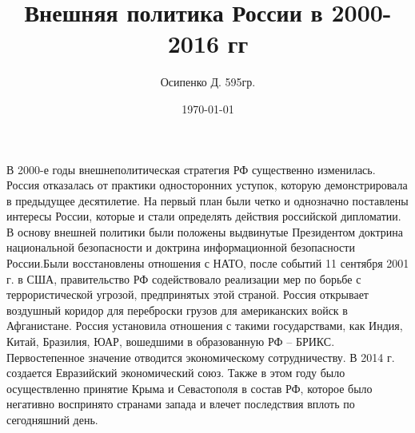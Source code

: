 \documentclass[a4paper, 12pt]{article}
\title{Внешняя политика России в 2000-2016 гг}
\author{Осипенко Д. 595гр.}
\date{\today}
\begin{document}
\sffamily
\maketitle
В 2000-е годы внешнеполитическая стратегия РФ существенно изменилась. Россия отказалась от практики односторонних уступок, которую демонстрировала в предыдущее десятилетие. На первый план были четко и однозначно поставлены интересы России, которые и стали определять действия российской дипломатии. В основу внешней политики были положены выдвинутые Президентом доктрина национальной безопасности и доктрина информационной безопасности России.Были восстановлены отношения с НАТО, после событий 11 сентября 2001 г. в США, правительство РФ содействовало реализации мер по борьбе с террористической угрозой, предпринятых этой страной. Россия открывает воздушный коридор для переброски грузов для американских войск в Афганистане. Россия установила отношения с такими государствами, как Индия, Китай, Бразилия, ЮАР, вошедшими в образованную РФ – БРИКС. Первостепенное значение отводится экономическому сотрудничеству. В 2014 г. создается Евразийский экономический союз. Также в этом году было осуществленно принятие Крыма и Севастополя в состав РФ, которое было негативно воспринято странами запада и влечет последствия вплоть по сегодняшний день.
\end{document}
